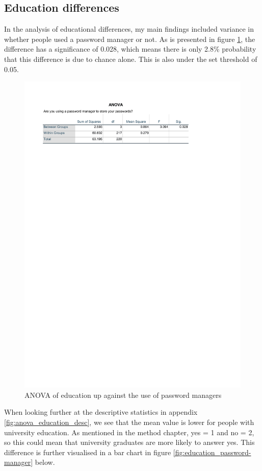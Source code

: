 \subsection{Education differences}
In the analysis of educational differences, my main findings included variance in whether people used a password manager or not. As is presented in figure \ref{fig:anova_education}, the difference has a significance of 0.028, which means there is only 2.8\% probability that this difference is due to chance alone. This is also under the set threshold of 0.05. 
\begin{figure}[!h]
    \centering
    \includegraphics[scale=0.8]{figures/tables/anova_education.pdf}
    \caption{ANOVA of education up against the use of password managers}
    \label{fig:anova_education}
\end{figure}
When looking further at the descriptive statistics in appendix \ref{fig:anova_education_desc}, we see that the mean value is lower for people with university education. As mentioned in the method chapter, yes = 1 and no = 2, so this could mean that university graduates are more likely to answer yes. This difference is further visualised in a bar chart in figure \ref{fig:education_password-manager} below. 

